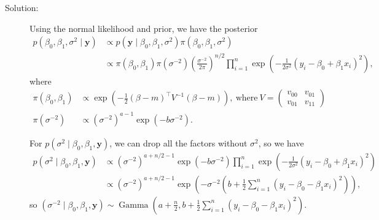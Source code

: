 \documentclass[letterpaper,11pt]{article}
\begin{document}
\begin{enumerate}
\begin{enumerate}
    \begin{description}
    \item[Solution:] Using the normal likelihood and prior, we have the posterior
      \begin{align*}
        p\left(\beta_0, \beta_1, \sigma^2\mid \mathbf{y}\right)
        &\propto p\left(\mathbf{y} \mid \beta_0, \beta_1, \sigma^2\right)\pi\left(
          \beta_0,\beta_1,\sigma^2
          \right) \\
        &\propto
          \pi\left(\beta_0,\beta_1\right)
          \pi\left(\sigma^{-2}\right)
          \left(\frac{\sigma^{-2}}{2\pi}\right)^{n/2}
          \prod_{i=1}^n
          \exp\left(
          -\frac{1}{2\sigma^2}\left(y_i - \beta_0 + \beta_1x_i\right)^2
          \right),
      \end{align*}
      where
      \begin{align*}
        \pi\left(\beta_0,\beta_1\right)
        &\propto \exp\left(-\frac{1}{2}
        \left(\beta - m\right)^\intercal V^{-1}\left(\beta - m\right)
        \right),~\text{where}~V=\begin{pmatrix}
        v_{00} & v_{01} \\ v_{01} & v_{11}
      \end{pmatrix} \\
        \pi\left(\sigma^{-2}\right)
        &\propto
        \left(\sigma^{-2}\right)^{a-1}\exp\left(-b\sigma^{-2}\right).
      \end{align*}

      For $p\left(\sigma^2 \mid \beta_0, \beta_1, \mathbf{y}\right)$, we can
      drop all the factors without $\sigma^2$, so we have
      \begin{align*}
        p\left(\sigma^2 \mid \beta_0, \beta_1, \mathbf{y}\right)
        &\propto
          \left(\sigma^{-2}\right)^{a + n/2 -1}\exp\left(-b\sigma^{-2}\right)
          \prod_{i=1}^n
          \exp\left(
          -\frac{1}{2\sigma^2}\left(y_i - \beta_0 + \beta_1x_i\right)^2
          \right) \\
        &\propto
          \left(\sigma^{-2}\right)^{a + n/2 -1}\exp\left(
          -\sigma^{-2}\left(b + \frac{1}{2}\sum_{i=1}^n\left(y_i - \beta_0 - \beta_1x_i\right)^2\right)
          \right),
      \end{align*}
      so $\boxed{\left(\sigma^{-2} \mid \beta_0, \beta_1, \mathbf{y} \right)\sim \operatorname{Gamma}\left(
          a + \frac{n}{2}, b + \frac{1}{2}\sum_{i=1}^n\left(y_i - \beta_0 - \beta_1x_i\right)^2\right).}$


\end{description}
\end{enumerate}
\end{enumerate}
\end{document}
